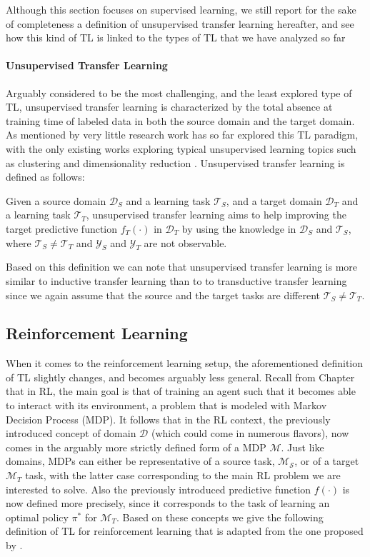 Although this section focuses on supervised learning, we still report for the sake of completeness a definition of unsupervised transfer learning hereafter, and see how this kind of TL is linked to the types of TL that we have analyzed so far

\paragraph{Unsupervised Transfer Learning}
Arguably considered to be the most challenging, and the least explored type of TL, unsupervised transfer learning is characterized by the total absence at training time of labeled data in both the source domain and the target domain. As mentioned by \citet{pan2009survey} very little research work has so far explored this TL paradigm, with the only existing works exploring typical unsupervised learning topics such as clustering \cite{dai2008self, jin2011transferring, qian2015cluster} and dimensionality reduction \cite{wang2008transferred, zhu2013self, zhu2016robust}. Unsupervised transfer learning is defined as follows:
\begin{definition}
	Given a source domain $\mathcal{D}_S$ and a learning task $\mathcal{T}_S$, and a target domain $\mathcal{D}_T$ and a learning task $\mathcal{T}_T$, unsupervised transfer learning aims to help improving the target predictive function $f_T(\cdot)$ in $\mathcal{D}_T$ by using the knowledge in $\mathcal{D}_S$ and $\mathcal{T}_S$, where $\mathcal{T}_S \neq \mathcal{T}_T$ and $\mathcal{Y}_S$ and $\mathcal{Y}_T$ are not observable. 
\end{definition}
Based on this definition we can note that unsupervised transfer learning is more similar to inductive transfer learning than to to transductive transfer learning since we again assume that the source and the target tasks are different $\mathcal{T}_S \neq \mathcal{T}_T$.


\subsection{Reinforcement Learning}
\label{sec:reinforcement_learning_tl}
When it comes to the reinforcement learning setup, the aforementioned definition of TL slightly changes, and becomes arguably less general. Recall from Chapter \label{ch:reinforcement_learning} that in RL, the main goal is that of training an agent such that it becomes able to interact with its environment, a problem that is modeled with Markov Decision Process (MDP). It follows that in the RL context, the previously introduced concept of domain $\mathcal{D}$ (which could come in numerous flavors), now comes in the arguably more strictly defined form of a MDP $\mathcal{M}$. Just like domains, MDPs can either be representative of a source task, $\mathcal{M_S}$, or of a target $\mathcal{M}_T$ task, with the latter case corresponding to the main RL problem we are interested to solve. Also the previously introduced predictive function $f(\cdot)$ is now defined more precisely, since it corresponds to the task of learning an optimal policy $\pi^*$ for $\mathcal{M}_T$. Based on these concepts we give the following definition of TL for reinforcement learning that is adapted from the one proposed by \citet{zhu2020transfer}.

